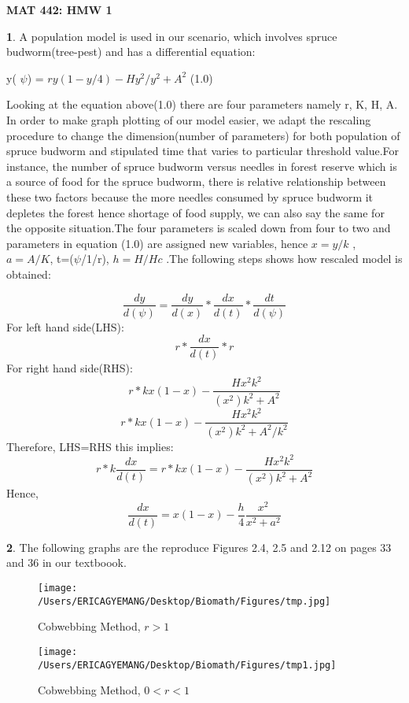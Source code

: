\documentclass[12pt]{article}
\begin{document}
\begin{center}
\textbf{ MAT 442: HMW 1}\\
\end{center}

\textbf{1}. A population model is used in our scenario, which involves spruce budworm(tree-pest) and has a differential equation:
\begin{center}

y( $\psi$) = $ry(1-y/4)-Hy^2/y^2+A^2$  \hspace{2cm}(1.0)
\end{center}
 Looking at the equation above(1.0) there are four parameters namely r, K, H, A. In order to make graph plotting of our model easier, we adapt the rescaling procedure to change the dimension(number of parameters) for both population of spruce budworm and stipulated time that varies to particular threshold value.For instance, the number of spruce budworm versus needles in forest reserve which is a source of food for the spruce budworm, there is relative relationship between these two factors  because the more needles consumed by spruce budworm it depletes the forest hence shortage of food supply, we can also say the same for the opposite situation.The four parameters is scaled down from four to two and parameters in equation (1.0) are assigned new variables, hence  $x=y/k$ , $a=A/K$, t=($\psi$/1/r), $h=H/Hc$ .The following steps shows how rescaled model is obtained:

 
 \[\frac{dy}{d(\psi)}= \frac{dy}{d(x)} *\frac{dx}{d(t)}*\frac{dt}{d(\psi)}\]    
For left hand side(LHS):
\[ r* \frac{dx}{d(t)}*r \]  
For right hand side(RHS):
\[ r* kx(1-x)-\frac{Hx^2k^2}{(x^2)k^2+A^2} \]  
\[ r* kx(1-x)-\frac{Hx^2k^2}{(x^2)k^2+A^2/k^2} \]  
Therefore,  LHS=RHS this implies:
\[ r* k\frac{dx}{d(t)}= r* kx(1-x)-\frac{Hx^2k^2}{(x^2)k^2+A^2} \]  
Hence, \[\frac{dx}{d(t)} = x(1-x)-\frac{h}{4}\frac{x^2}{x^2+a^2} \]  



\cleardoublepage        



\textbf{2}. The following graphs are the reproduce Figures 2.4, 2.5 and 2.12 on pages 33 and 36 in our textboook.
\begin{figure} [ht!]
 \centering
 \texttt{[image: /Users/ERICAGYEMANG/Desktop/Biomath/Figures/tmp.jpg]} 
\caption[Figure 2.4: r>1]{Cobwebbing Method, $r>1$}
 \label{fig::model}
\end{figure}

\begin{figure} [ht!]
 \centering
 \texttt{[image: /Users/ERICAGYEMANG/Desktop/Biomath/Figures/tmp1.jpg]} 
\caption[Figure 5]{Cobwebbing Method, $0<r<1$}
 \label{fig::model}
\end{figure}  
 
\end{document}

